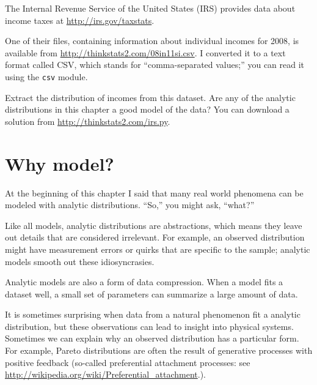 \documentclass[12pt]{book}
\begin{document}
\begin{exercise}
\label{irs}

The Internal Revenue Service of the United States (IRS) provides data
about income taxes at \url{http://irs.gov/taxstats}.

One of their files, containing information about individual incomes
for 2008, is available from \url{http://thinkstats2.com/08in11si.csv}.  I
converted it to a text format called CSV, which stands for
``comma-separated values;'' you can read it using the {\tt csv}
module.

Extract the distribution of incomes from this dataset.  Are any of
the analytic distributions in this chapter a good model of
the data?  You can download a solution from \url{http://thinkstats2.com/irs.py}.

\end{exercise}


\section{Why model?}

At the beginning of this chapter I said that many real world phenomena
can be modeled with analytic distributions.  ``So,'' you might ask,
``what?''

Like all models, analytic distributions are abstractions, which
means they leave out details that are considered irrelevant.
For example, an observed distribution might have measurement errors
or quirks that are specific to the sample; analytic models smooth
out these idiosyncrasies.

Analytic models are also a form of data compression.  When a model
fits a dataset well, a small set of parameters can summarize a
large amount of data.

It is sometimes surprising when data from a natural phenomenon fit a
analytic distribution, but these observations can lead to insight
into physical systems.  Sometimes we can explain why an observed
distribution has a particular form.  For example, Pareto distributions
are often the result of generative processes with positive feedback
(so-called preferential attachment processes: see
\url{http://wikipedia.org/wiki/Preferential_attachment}.).
\end{document}
